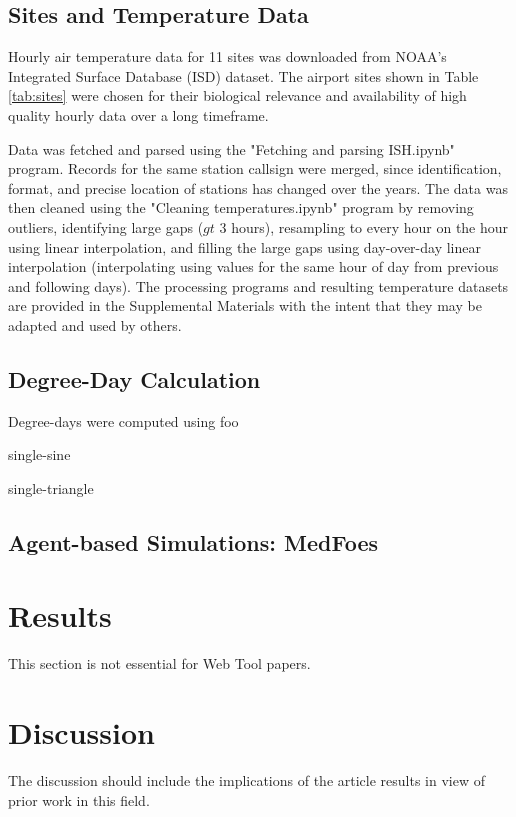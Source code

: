 \documentclass[10pt,a4paper,twocolumn]{article}
\begin{document}
\subsection*{Sites and Temperature Data}
Hourly air temperature data for 11 sites was downloaded from 
NOAA's Integrated Surface Database (ISD) dataset\cite{smith_integrated_2011,NOAA_ISD_portal}.
The airport sites shown in Table \ref{tab:sites}
were chosen for their biological relevance and 
availability of high quality hourly data over a long timeframe.

Data was fetched and parsed using the "Fetching and parsing ISH.ipynb" program.
Records for the same station callsign were merged, since identification, format, 
and precise location of stations has changed over the years.
The data was then cleaned using the 
"Cleaning temperatures.ipynb" program by 
removing outliers, 
identifying large gaps ($gt$ 3 hours), 
resampling to every hour on the hour using linear interpolation,
and filling the large gaps using day-over-day linear interpolation
(interpolating using values for the same hour of day from previous and following days).
The processing programs and resulting temperature datasets are 
provided in the Supplemental Materials with the intent that they 
may be adapted and used by others.


\subsection*{Degree-Day Calculation}
Degree-days were computed using 
foo\cite{Roltsch1999}

single-sine\cite{ECY:ECY1969503514}

single-triangle\cite{10.2307/1933072}

\subsection*{Agent-based Simulations: MedFoes}


\section*{Results}
This section is not essential for Web Tool papers.

\section*{Discussion}
The discussion should include the implications of the article results in view of prior work in this field.
\end{document}
